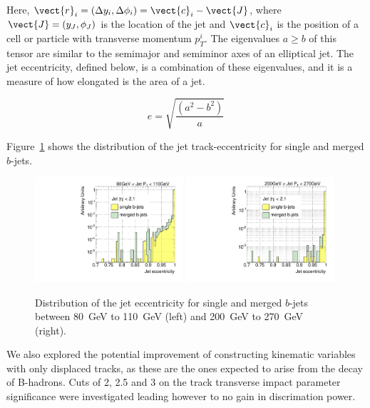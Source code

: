 Here, $\vect{r}_i = (\Delta y_i, \Delta \phi_i) = \vect{c}_i - \vect{J}$, where $\vect{J} = (y_J,\phi_J)$ is the location of the jet and $\vect{c}_i$ is the position of a cell or particle with transverse momentum $p^i_T$. The eigenvalues $a \geq b$ of this tensor are similar to the semimajor and semiminor axes of an elliptical jet. The jet eccentricity, defined below, is a combination of these eigenvalues, and it is a measure of how elongated is the area of a jet.

\begin{equation} 
e = \sqrt{\frac{(a^2 - b^2)}{a}}
\label{eqn:ecc}
\end{equation}


Figure~\ref{fig:jeteccsinglemerged} shows the distribution of the jet track-eccentricity for single and merged $b$-jets.
\\[3mm]

\begin{figure}[tp]
\centering
\includegraphics[width=0.49\textwidth]{FIGS/VarsSingleMerged/JetEcc080.pdf}
\includegraphics[width=0.49\textwidth]{FIGS/VarsSingleMerged/JetEcc200.pdf}
\caption{Distribution of the jet eccentricity for single and merged $b$-jets between 80~GeV to 110~GeV (left) and 200~GeV to 270~GeV (right).}
\label{fig:jeteccsinglemerged}
\end{figure}


We also explored the potential improvement of constructing kinematic variables with only displaced tracks, as these are the ones expected to arise from the decay of B-hadrons. Cuts of 2, 2.5 and 3 on the track transverse impact parameter significance were investigated leading however to no gain in discrimation power.

